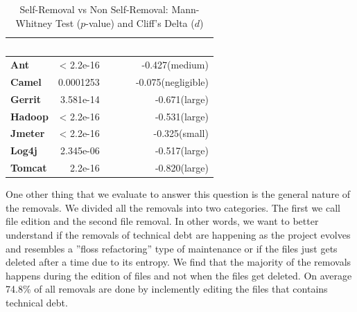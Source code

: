\begin{table}[t]
	\begin{center}
		\caption{Self-Removal vs Non Self-Removal: Mann-Whitney Test ($p$-value) and Cliff's Delta ($d$) }
		\label{tbl:statistic}
		\begin{tabular}{l| rrr}
			\toprule
			\textbf{\thead{Project}} & \textbf{\thead{$p$-value}}&~~~ & \textbf{\thead{$d$}}\\ 
			\midrule
			\textbf{Ant   }   &  < 2.2e-16& ~~~  &  -0.427(medium)  \\  
			\textbf{Camel }   &  0.0001253& ~~~ &  -0.075(negligible)  \\  
			\textbf{Gerrit}   &  3.581e-14& ~~~ &  -0.671(large)  \\  
			\textbf{Hadoop}   &  < 2.2e-16& ~~~ &  -0.531(large)  \\  
			\textbf{Jmeter}   &  < 2.2e-16& ~~~ &  -0.325(small)  \\  
			\textbf{Log4j}   &  2.345e-06 & ~~~ &  -0.517(large)  \\  
			\textbf{Tomcat}   &  2.2e-16  & ~~~ &  -0.820(large) \\  
			\bottomrule
		\end{tabular}
	\end{center}    
\end{table}





One other thing that we evaluate to answer this question is the general nature of the removals. We divided all the removals into two categories. The first we call file edition and the second file removal. In other words, we want to better understand if the removals of technical debt are happening as the project evolves and resembles a ''floss refactoring'' type of maintenance or if the files just gets deleted after a time due to its entropy. We find that the majority of the removals happens during the edition of files and not when the files get deleted. On average 74.8\% of all removals are done by inclemently editing the files that contains technical debt. 




